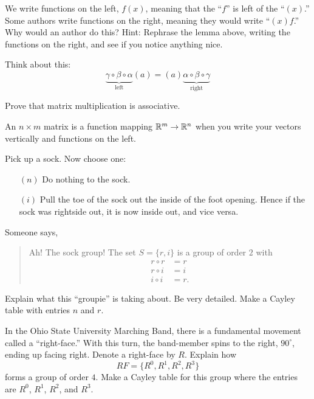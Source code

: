 \documentclass{ximera}
\begin{document}
\begin{exercise}
  We write functions on the left, $f(x)$, meaning that the ``$f$'' is
  left of the ``$(x)$.''  Some authors write functions on the right,
  meaning they would write ``$(x)f$.'' Why would an author do this? Hint:
  Rephrase the lemma above, writing the functions on the right, and
  see if you notice anything nice.
  \begin{hint}
    Think about this:
    \[
    \underbrace{\gamma\circ\beta\circ\alpha}_{\text{left}}(a) = (a)\underbrace{\alpha\circ\beta\circ\gamma}_{\text{right}}
    \]
  \end{hint}
\end{exercise}



\begin{exercise}
  Prove that matrix multiplication is associative.
  \begin{hint}
    An $n\times m$ matrix is a function mapping $\mathbb R^m\to \mathbb R^n$ when
    you write your vectors vertically and functions on the left.
  \end{hint}
\end{exercise}




\begin{exercise}\label{E:SG}
  Pick up a sock. Now choose one:
  \begin{enumerate}
  \item[$(n)$] Do nothing to the sock.
  \item[$(i)$] Pull the toe of the sock out the inside of the foot
    opening. Hence if the sock was rightside out, it is now inside
    out, and vice versa.
  \end{enumerate}
  Someone says,
  \begin{quote}
    Ah! The sock group! The set $S =\{r,i\}$ is a group of order $2$ with
    \begin{align*}
      r\circ r &= r\\
  r\circ i &= i\\
  i\circ i &= r.
  \end{align*}
  \end{quote}
  Explain what this ``groupie'' is taking about. Be very
  detailed. Make a Cayley table with entries $n$ and $r$. 
\end{exercise}

\begin{exercise}\label{E:rf}
  In the Ohio State University Marching Band, there is a fundamental
  movement called a ``right-face.'' With this turn, the band-member
  spins to the right, $90^\circ$, ending up facing right. Denote a
  right-face by $R$. Explain how
  \[
  RF=\{R^0,R^1,R^2,R^3\}
  \]
  forms a group of order $4$. Make a Cayley table for this group where the entries
  are $R^0$, $R^1$, $R^2$, and $R^3$.
\end{exercise}
\end{document}
